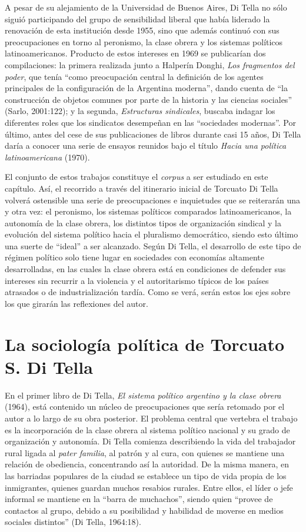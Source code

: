 A pesar de su alejamiento de la Universidad de Buenos Aires, Di Tella no sólo siguió participando del grupo de sensibilidad liberal que había liderado la renovación de esta institución desde 1955, sino que además continuó con sus preocupaciones en torno al peronismo, la clase obrera y los sistemas políticos latinoamericanos. Producto de estos intereses en 1969 se publicarían dos compilaciones: la primera realizada junto a Halperín Donghi, \emph{Los fragmentos del poder}, que tenía ``como preocupación central la definición de los agentes principales de la configuración de la Argentina moderna'', dando cuenta de ``la construcción de objetos comunes por parte de la historia y las ciencias sociales'' (Sarlo, 2001:122); y la segunda, \emph{Estructuras sindicales}, buscaba indagar los diferentes roles que los sindicatos desempeñan en las ``sociedades modernas''. Por último, antes del cese de sus publicaciones de libros durante casi 15 años, Di Tella daría a conocer una serie de ensayos reunidos bajo el título \emph{Hacia una política latinoamericana} (1970).

El conjunto de estos trabajos constituye el \emph{corpus} a ser estudiado en este capítulo. Así, el recorrido a través del itinerario inicial de Torcuato Di Tella volverá ostensible una serie de preocupaciones e inquietudes que se reiterarán una y otra vez: el peronismo, los sistemas políticos comparados latinoamericanos, la autonomía de la clase obrera, los distintos tipos de organización sindical y la evolución del sistema político hacia el pluralismo democrático, siendo esto último una suerte de ``ideal'' a ser alcanzado. Según Di Tella, el desarrollo de este tipo de régimen político solo tiene lugar en sociedades con economías altamente desarrolladas, en las cuales la clase obrera está en condiciones de defender sus intereses sin recurrir a la violencia y el autoritarismo típicos de los países atrasados o de industrialización tardía. Como se verá, serán estos los ejes sobre los que girarán las reflexiones del autor.

\section{La sociología política de Torcuato S. Di Tella}

En el primer libro de Di Tella, \emph{El sistema político argentino y la clase obrera} (1964), está contenido un núcleo de preocupaciones que sería retomado por el autor a lo largo de su obra posterior. El problema central que vertebra el trabajo es la incorporación de la clase obrera al sistema político nacional y su grado de organización y autonomía. Di Tella comienza describiendo la vida del trabajador rural ligada al \emph{pater familia}, al patrón y al cura, con quienes se mantiene una relación de obediencia, concentrando así la autoridad. De la misma manera, en las barriadas populares de la ciudad se establece un tipo de vida propia de los inmigrantes, quienes guardan muchos resabios rurales. Entre ellos, el líder o jefe informal se mantiene en la ``barra de muchachos'', siendo quien ``provee de contactos al grupo, debido a su posibilidad y habilidad de moverse en medios sociales distintos'' (Di Tella, 1964:18).

